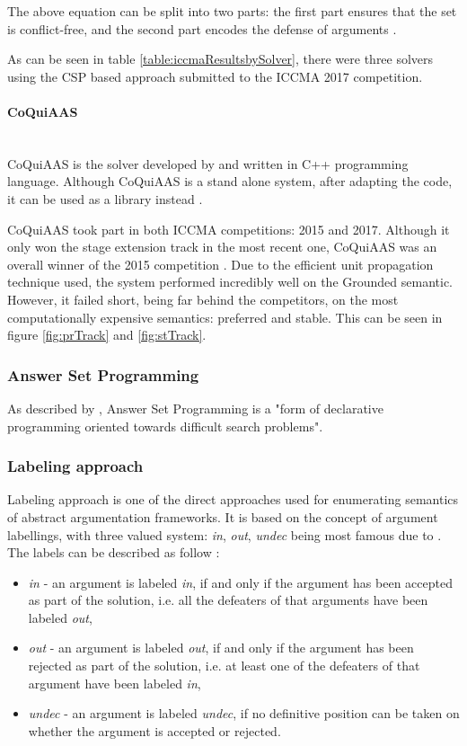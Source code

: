 The above equation can be split into two parts: the first part ensures that the set is conflict-free, and the second part encodes the defense of arguments \citep{csp2}. 

As can be seen in table \ref{table:iccmaResultsbySolver}, there were three solvers using the CSP based approach submitted to the ICCMA 2017 competition. 

\paragraph{CoQuiAAS} \mbox{} \\
CoQuiAAS is the solver developed by \citet{coquiaas} and written in C++ programming language. Although CoQuiAAS is a stand alone system, after adapting the code, it can be used as a library instead \citep{coquiaas}.

CoQuiAAS took part in both ICCMA competitions: 2015 and 2017. Although it only won the stage extension track in the most recent one, CoQuiAAS was an overall winner of the 2015 competition \citep{iccma2015}. Due to the efficient unit propagation technique used, the system performed incredibly well on the Grounded semantic. However, it failed short, being far behind the competitors, on the most computationally expensive semantics: preferred and stable. This can be seen in figure \ref{fig:prTrack} and \ref{fig:stTrack}.

\subsubsection{Answer Set Programming}
As described by \citet{asp}, Answer Set Programming is a "form of declarative programming oriented towards difficult search problems".


\subsubsection{Labeling approach}
Labeling approach is one of the direct approaches used for enumerating semantics of abstract argumentation frameworks. It is based on the concept of argument labellings, with three valued system: \textit{in}, \textit{out}, \textit{undec} being most famous due to \citet{caminadaLabeling}. The labels can be described as follow \citep{caminada2008gentle}:

\begin{itemize}
	\item \textit{in} - an argument is labeled \textit{in}, if and only if the argument has been accepted as part of the solution, i.e. all the defeaters of that arguments have been labeled \textit{out},
	\item \textit{out} - an argument is labeled \textit{out}, if and only if the argument has been rejected as part of the solution, i.e. at least one of the defeaters of that argument have been labeled \textit{in},
	\item \textit{undec} - an argument is labeled \textit{undec}, if no definitive position can be taken on whether the argument is accepted or rejected.
\end{itemize}

